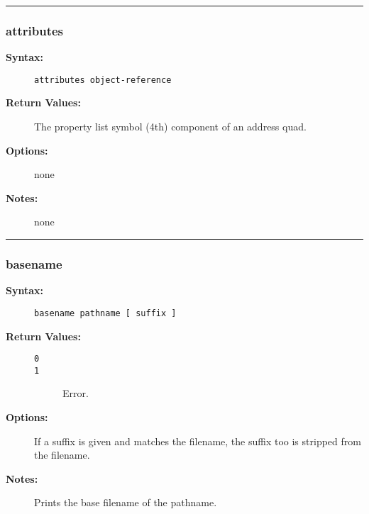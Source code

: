 \hrule
\subsubsection{attributes}

\begin{description}
\item[{\bf Syntax:}] \mbox{}

{\tt attributes object-reference}

\item[{\bf Return Values:}] \mbox{}

The property list symbol (4th) component 
of an address quad.

\item[{\bf Options:}] \mbox{}

none  

\item[{\bf Notes:}] \mbox{}

none

\end{description}


\hrule
\subsubsection{basename}

\begin{description}
\item[{\bf Syntax:}] \mbox{}

{\tt basename pathname [ suffix ]}

\item[{\bf Return Values:}] \mbox{}

\begin{description}
\item[{\tt 0}] \mbox{}



\item[{\tt 1}] \mbox{}

Error.

\end{description}


\item[{\bf Options:}] \mbox{}

If a suffix is given and matches the filename, 
the suffix too is stripped from the filename.

\item[{\bf Notes:}] \mbox{}

Prints the base filename of the pathname.

\end{description}


